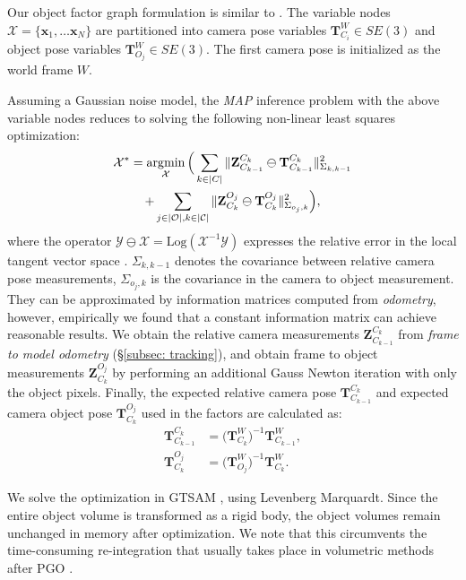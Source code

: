 Our object factor graph formulation is similar to \cite{salas-morenoSLAMSimultaneousLocalisation2013, mccormacFusionVolumetricObjectLevel2018}. The variable nodes $\mathcal{X} = \{\mathbf{x}_1, \dots \mathbf{x}_N\}$ are partitioned into camera pose variables $\mathbf{T}^{W}_{C_i} \in SE(3)$ and object pose variables $\mathbf{T}^W_{O_j} \in SE(3)$. The first camera pose is initialized as the world frame $W$.

Assuming a Gaussian noise model, the \textit{MAP} inference problem with the above variable nodes reduces to solving the following non-linear least squares optimization:
\begin{multline}
    \mathcal{X}^* = \operatorname*{\arg\!\min}_{\mathcal{X}} \Big( \sum_{k \in |C|} \|  \mathbf{Z}^{C_k}_{C_{k-1}} \ominus \mathbf{T}^{C_k}_{C_{k-1}} \|_{\Sigma_{k,k-1}}^2 \\
    + \sum_{j \in |\mathcal{O}|, k \in |\mathcal{C}|} \| \mathbf{Z}^{O_j}_{C_k} \ominus \mathbf{T}^{O_j}_{C_k} \|_{\Sigma_{o_j, k}}^2 \Big),
\end{multline}
where the operator $ \mathcal{Y} \ominus \mathcal{X} = \text{Log}(\mathcal{X}^{-1} \mathcal{Y})$ expresses the relative error in the local tangent vector space \cite{solaMicroLieTheory2020}. $\Sigma_{k, k-1}$ denotes the covariance between relative camera pose measurements,  $\Sigma_{o_j, k}$ is the covariance in the camera to object measurement. They can be approximated by information matrices computed from \textit{odometry}, however, empirically we found that a constant information matrix can achieve reasonable results. We obtain the relative camera measurements $\mathbf{Z}^{C_k}_{C_{k-1}}$ from \textit{frame to model odometry} (\S\ref{subsec: tracking}), and obtain frame to object measurements $\mathbf{Z}^{O_j}_{C_k}$ by performing an additional Gauss Newton iteration with only the object pixels. Finally, the expected relative camera pose $\mathbf{T}^{C_k}_{C_{k-1}}$ and expected camera object pose $\mathbf{T}^{O_j}_{C_k}$ used in the factors are calculated as:
\begin{align}
    \mathbf{T}^{C_k}_{C_{k-1}} &= \bigg({\mathbf{T}^{W}_{C_k}}\bigg)^{-1} \mathbf{T}^{W}_{C_{k-1}}, \\
    \mathbf{T}^{O_j}_{C_k} &= \bigg({\mathbf{T}^{W}_{O_j}}\bigg)^{-1} \mathbf{T}^{W}_{C_k}.
\end{align}

We solve the optimization in GTSAM \cite{dellaert2012factor}, using Levenberg Marquardt. Since the entire object volume is transformed as a rigid body, the object volumes remain unchanged in memory after optimization. We note that this circumvents the time-consuming re-integration that usually takes place in volumetric methods after PGO \cite{whelanElasticFusionDenseSLAM2015}.


